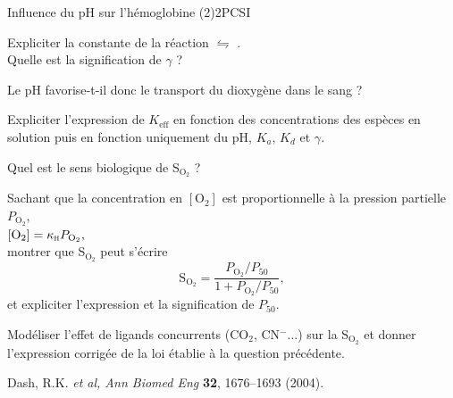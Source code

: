 \begin{exercise}{Influence du pH sur l'hémoglobine (2)}{2}{PCSI}
\begin{questions}
\question Expliciter la constante de la réaction  $\leftrightharpoons$ . \\
Quelle est la signification de $\gamma$ ?

\question Le pH favorise-t-il donc le transport du dioxygène dans le sang ?


\question Expliciter l'expression de $K_\text{eff}$ en fonction des concentrations des espèces en solution puis en fonction uniquement du pH, $K_a$, $K_d$ et $\gamma$.


\question Quel est le sens biologique de S$_{\text{O}_2}$ ?

\question Sachant que la concentration en $[\text{O}_2]$ est proportionnelle à la pression partielle $P_{\text{O}_2}$,\\
\hfill $[\text{O}_2] = \kappa_\textsc{h} P_{\text{O}_2},$ \hfill ~\\
montrer que S$_{\text{O}_2}$ peut s'écrire
$$\text{S}_{\text{O}_2} = \dfrac{P_{\text{O}_2}/P_{50}}{1 + P_{\text{O}_2}/P_{50}},$$
et expliciter l'expression et la signification de $P_{50}$.

 Modéliser l'effet de ligands concurrents (CO$_2$, CN$^-$...) sur la S$_{\text{O}_2}$ et donner l'expression corrigée de la loi établie à la question précédente.

\end{questions}

\plusloin
Dash, R.K. \emph{et al, Ann Biomed Eng} \textbf{32}, 1676--1693 (2004).

\end{exercise}

